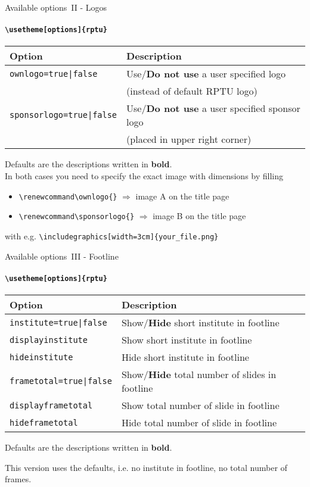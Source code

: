 \documentclass[aspectratio=169]{beamer}
\begin{document}
\begin{frame}{Available options~II - Logos}
	\framesubtitle{\texttt{\textbackslash usetheme[options]\{rptu\}}}
	\begin{tabular}{ll}
		\textbf{Option} & \textbf{Description}\\ \toprule
		\texttt{ownlogo=true|false} & Use/\textbf{Do not use} a user specified logo \\ 
		& (instead of default RPTU logo) \\
		\texttt{sponsorlogo=true|false} & Use/\textbf{Do not use} a user specified sponsor logo \\ & (placed in upper right corner) \\\bottomrule
	\end{tabular}
	\vspace*{2ex}
	
	Defaults are the descriptions written in \textbf{bold}.\\ In both cases you need to specify the exact image with dimensions by filling 
	\begin{itemize}
		\item \texttt{\textbackslash renewcommand{\textbackslash ownlogo}\{\}} \hspace{1em}$\Rightarrow$\hspace{1em} image A on the title page
		\item \texttt{\textbackslash renewcommand{\textbackslash sponsorlogo}\{\}}  \hspace{1em}$\Rightarrow$\hspace{1em} image B on the title page
	\end{itemize}
	with e.g. \texttt{\textbackslash includegraphics[width=3cm]\{your\_file.png\}}
\end{frame}

\begin{frame}{Available options~III - Footline}
	\framesubtitle{\texttt{\textbackslash usetheme[options]\{rptu\}}}
	\begin{tabular}{ll}
		\textbf{Option} & \textbf{Description}\\ \toprule
		\texttt{institute=true|false} &Show/\textbf{Hide} short institute in footline \\
		\texttt{displayinstitute} & Show short institute in footline \\ 
		\texttt{hideinstitute} & Hide short institute in footline \\ \midrule
		\texttt{frametotal=true|false} &Show/\textbf{Hide} total number of slides in footline\\
		\texttt{displayframetotal} & Show total number of slide in footline\\ 
		\texttt{hideframetotal} & Hide total number of slide in footline\\  \bottomrule
	\end{tabular}
	\vspace*{2ex}
	
	Defaults are the descriptions written in \textbf{bold}.
	
	This version uses the defaults, i.e. no institute in footline, no total number of frames.
\end{frame}
\end{document}

